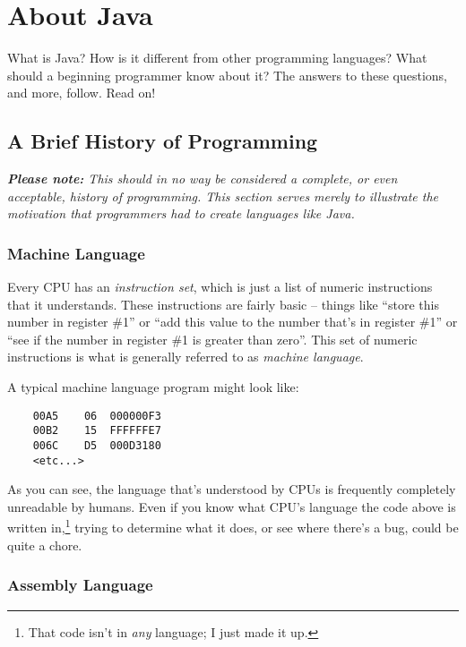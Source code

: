 
\chapter{About Java}

\minitoc

What is Java?  How is it different from other programming languages?  What should a beginning programmer know about it?  The answers to these questions, and more, follow.  Read on!

\section{A Brief History of Programming}

\textit{\textbf{Please note:} This should in no way be considered a complete, or even acceptable, history of programming.  This section serves merely to illustrate the motivation that programmers had to create languages like Java.}

\subsection{Machine Language}

Every CPU has an \textit{instruction set}, which is just a list of numeric instructions that it understands.  These instructions are fairly basic -- things like ``store this number in register \#1'' or ``add this value to the number that's in register \#1'' or ``see if the number in register \#1 is greater than zero''.  This set of numeric instructions is what is generally referred to as \textit{machine language}.

A typical machine language program might look like:

\begin{minipage}{\textwidth}
\begin{verbatim}
    00A5    06  000000F3
    00B2    15  FFFFFFE7
    006C    D5  000D3180
    <etc...>
\end{verbatim}
\end{minipage}

As you can see, the language that's understood by CPUs is frequently completely unreadable by humans.  Even if you know what CPU's language the code above is written in,\footnote{That code isn't in \textit{any} language; I just made it up.} trying to determine what it does, or see where there's a bug, could be quite a chore.

\subsection{Assembly Language}

